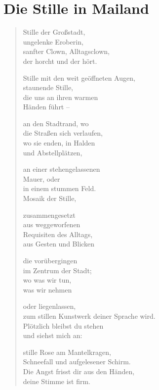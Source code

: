
\cleartoverso

\section{Die Stille in Mailand}


\begin{verse}

Stille der Großstadt,\\
ungelenke Eroberin,\\
sanfter Clown, Alltagsclown,\\
der horcht und der hört.

Stille mit den weit geöffneten Augen,\\
staunende Stille,\\
die uns an ihren warmen\\
Händen führt --

an den Stadtrand, wo\\
die Straßen sich verlaufen,\\
wo sie enden, in Halden\\
und Abstellplätzen,

an einer stehengelassenen\\
Mauer, oder\\
in einem stummen Feld.\\
Mosaik der Stille,

zusammengesetzt\\
aus weggeworfenen\\
Requisiten des Alltags,\\
aus Gesten und Blicken

\clearpage

die vorübergingen\\
im Zentrum der Stadt;\\
wo was wir tun,\\
was wir nehmen

oder liegenlassen,\\
zum stillen Kunstwerk deiner Sprache wird.\\
Plötzlich bleibst du stehen\\
und siehst mich an:

stille Rose am Mantelkragen,\\
Schneefall und aufgelesener Schirm.\\
Die Angst frisst dir aus den Händen,\\
deine Stimme ist firm.

\end{verse}

